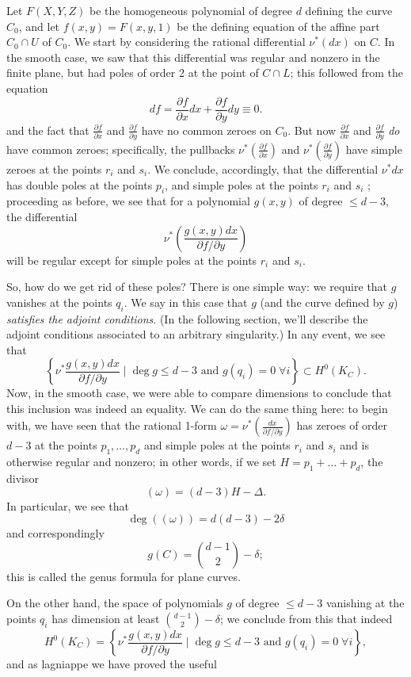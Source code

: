 Let $F(X,Y,Z)$ be the homogeneous polynomial of degree $d$ defining the curve $C_0$, and let $f(x,y) = F(x,y,1)$ be the defining equation of the affine part $C_0 \cap U$ of $C_0$. We start by considering the rational differential $\nu^*(dx)$ on $C$. In the smooth case, we saw that this differential was regular and nonzero in the finite plane, but had poles of order 2 at the point of $C \cap L$; this followed from the equation
$$
 df = \frac{\partial f}{\partial x}dx + \frac{\partial f}{\partial y}dy \equiv 0.
 $$
and the fact that $\frac{\partial f}{\partial x}$ and $\frac{\partial f}{\partial y}$ have no common zeroes on $C_0$. But now $\frac{\partial f}{\partial x}$ and $\frac{\partial f}{\partial y}$ \emph{do} have common zeroes; specifically, the pullbacks $\nu^*(\frac{\partial f}{\partial x})$ and $\nu^*(\frac{\partial f}{\partial y})$ have simple zeroes at the points $r_i$ and $s_i$. We conclude, accordingly, that the differential $\nu^*dx$ has double poles at the points $p_i$, and simple poles at the points $r_i$ and $s_i$ ; proceeding as before, we see that for a polynomial $g(x,y)$ of degree $\leq d-3$, the differential
$$
\nu^*( \frac{g(x,y)dx}{\partial f/\partial y})
$$
will be regular except for simple poles at the points $r_i$ and $s_i$.

So, how do we get rid of these poles? There is one simple way: we require that $g$ vanishes at the points $q_i$. We say in this case that $g$ (and the curve defined by $g$) \emph{satisfies the adjoint conditions}. (In the following section, we'll describe the adjoint conditions associated to an arbitrary singularity.) In any event, we see that
$$
 \left\{ \nu^* \frac{g(x,y)dx}{\partial f/\partial y} \mid \deg g \leq d-3 \text{ and } g(q_i) = 0 \; \forall i \right\} \subset H^0(K_C).
$$
Now, in the smooth case, we were able to compare dimensions to conclude that this inclusion was indeed an equality. We can do the same thing here: to begin with, we have seen that the  rational 1-form $\omega = \nu^*(\frac{dx}{\partial f/\partial y})$ has zeroes of order $d-3$ at the points $p_1,\dots,p_d$ and simple poles at the points $r_i$ and $s_i$ and is otherwise regular and nonzero; in other words, if we set $H = p_1+\dots + p_d$, the divisor
$$
(\omega) = (d-3)H - \Delta.
$$
In particular, we see that
$$
\deg((\omega)) = d(d-3) - 2\delta
$$
and correspondingly
$$
g(C) = \binom{d-1}{2} - \delta;
$$
this is called the genus formula for plane curves.

On the other hand, the space of polynomials $g$ of degree $\leq d-3$ vanishing at the points $q_i$ has dimension at least $ \binom{d-1}{2} - \delta$; we conclude from this that indeed
$$
H^0(K_C) =  \left\{ \nu^* \frac{g(x,y)dx}{\partial f/\partial y} \mid \deg g \leq d-3 \text{ and } g(q_i) = 0 \; \forall i \right\},
$$
and as lagniappe we have proved the useful

